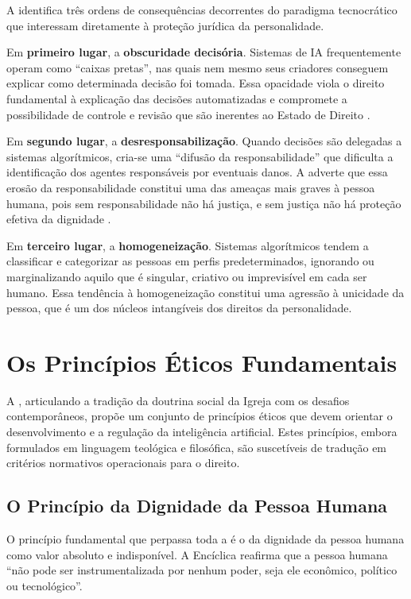 A \MH{} identifica três ordens de consequências decorrentes do paradigma tecnocrático que interessam diretamente à proteção jurídica da personalidade.

Em \textbf{primeiro lugar}, a \textbf{obscuridade decisória}. Sistemas de IA frequentemente operam como ``caixas pretas'', nas quais nem mesmo seus criadores conseguem explicar como determinada decisão foi tomada. Essa opacidade viola o direito fundamental à explicação das decisões automatizadas e compromete a possibilidade de controle e revisão que são inerentes ao Estado de Direito \cite{Pasquale2015BM, Wachter2017TSP}.

Em \textbf{segundo lugar}, a \textbf{desresponsabilização}. Quando decisões são delegadas a sistemas algorítmicos, cria-se uma ``difusão da responsabilidade'' que dificulta a identificação dos agentes responsáveis por eventuais danos. A \MH{} adverte que essa erosão da responsabilidade constitui uma das ameaças mais graves à pessoa humana, pois sem responsabilidade não há justiça, e sem justiça não há proteção efetiva da dignidade \cite{Jonas1979PR}.

Em \textbf{terceiro lugar}, a \textbf{homogeneização}. Sistemas algorítmicos tendem a classificar e categorizar as pessoas em perfis predeterminados, ignorando ou marginalizando aquilo que é singular, criativo ou imprevisível em cada ser humano. Essa tendência à homogeneização constitui uma agressão à unicidade da pessoa, que é um dos núcleos intangíveis dos direitos da personalidade.

\section{Os Princípios Éticos Fundamentais}
\label{sec:principios-eticos}

A \MH{}, articulando a tradição da doutrina social da Igreja com os desafios contemporâneos, propõe um conjunto de princípios éticos que devem orientar o desenvolvimento e a regulação da inteligência artificial. Estes princípios, embora formulados em linguagem teológica e filosófica, são suscetíveis de tradução em critérios normativos operacionais para o direito.

\subsection{O Princípio da Dignidade da Pessoa Humana}
\label{subsec:principio-dignidade}

O princípio fundamental que perpassa toda a \MH{} é o da dignidade da pessoa humana como valor absoluto e indisponível. A Encíclica reafirma que a pessoa humana ``não pode ser instrumentalizada por nenhum poder, seja ele econômico, político ou tecnológico''.

